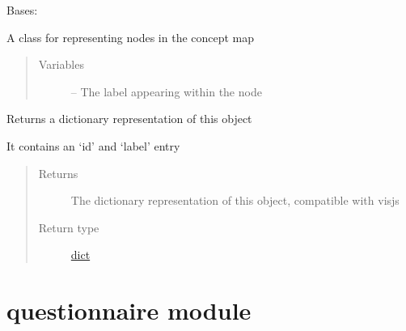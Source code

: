 \documentclass[letterpaper,10pt,english]{sphinxmanual}
\begin{document}
\begin{fulllineitems}
\label{\detokenize{node:node.Node}}
Bases: 

A class for representing nodes in the concept map
\begin{quote}\begin{description}
\item[{Variables}] \leavevmode
{} -- The label appearing within the node

\end{description}\end{quote}

\begin{fulllineitems}
\label{\detokenize{node:node.Node.to_dict}}
Returns a dictionary representation of this object

It contains an `id' and `label' entry
\begin{quote}\begin{description}
\item[{Returns}] \leavevmode
The dictionary representation of this object, compatible with visjs

\item[{Return type}] \leavevmode
\href{https://docs.python.org/2/library/stdtypes.html\#dict}{dict}

\end{description}\end{quote}

\end{fulllineitems}


\end{fulllineitems}



\section{questionnaire module}
\label{\detokenize{questionnaire:module-questionnaire}}\label{\detokenize{questionnaire:questionnaire-module}}\label{\detokenize{questionnaire::doc}}
\end{document}
